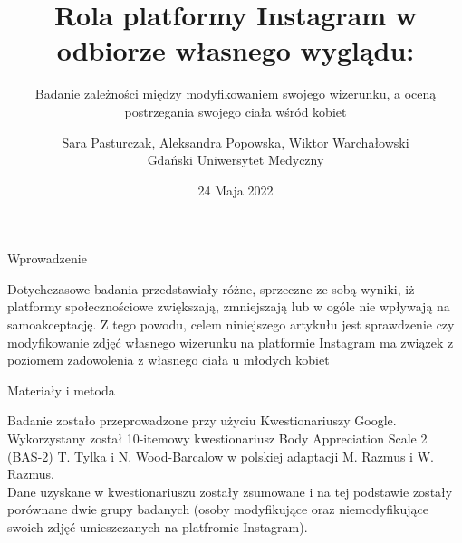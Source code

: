 \documentclass[pdf]{beamer}
\title{Rola platformy Instagram w odbiorze własnego wyglądu:}
\subtitle{Badanie zależności między modyfikowaniem swojego wizerunku, a oceną postrzegania swojego ciała wśród kobiet}
\author{Sara Pasturczak, Aleksandra Popowska, Wiktor Warchałowski\\Gdański Uniwersytet Medyczny}
\date{24 Maja 2022}
\begin{document}
\begin{frame}
  \titlepage
\end{frame}

\begin{frame}{Wprowadzenie}
\begin{center}
Dotychczasowe badania przedstawiały różne, sprzeczne ze sobą wyniki, iż platformy społecznościowe zwiększają, zmniejszają lub w ogóle nie wpływają na samoakceptację. Z tego powodu, celem niniejszego artykułu jest sprawdzenie czy modyfikowanie zdjęć własnego wizerunku na platformie Instagram ma związek z poziomem zadowolenia z własnego ciała u młodych kobiet
\end{center}
\end{frame}

\begin{frame}{Materiały i metoda}
\begin{center}
Badanie zostało przeprowadzone przy użyciu Kwestionariuszy Google. Wykorzystany został 10-itemowy kwestionariusz Body Appreciation Scale 2 (BAS-2) T. Tylka i N. Wood-Barcalow w polskiej adaptacji M. Razmus i W. Razmus. \\
Dane uzyskane w kwestionariuszu zostały zsumowane i na tej podstawie zostały porównane dwie grupy badanych (osoby modyfikujące oraz niemodyfikujące swoich zdjęć umieszczanych na platfromie Instagram).
\end{center}
\end{frame}
\end{document}
